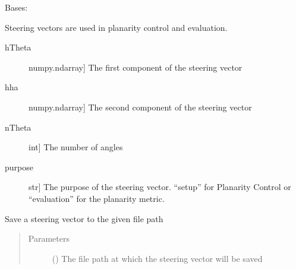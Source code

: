 \documentclass[letterpaper,10pt,english]{sphinxmanual}
\begin{document}
\begin{fulllineitems}
\label{\detokenize{source/pyzones:pyzones.SteeringVector}}
Bases: 

Steering vectors are used in planarity control and evaluation.
\begin{description}
\item[{hTheta}] \leavevmode{[}numpy.ndarray{]}
The first component of the steering vector

\item[{hha}] \leavevmode{[}numpy.ndarray{]}
The second component of the steering vector

\item[{nTheta}] \leavevmode{[}int{]}
The number of angles

\item[{purpose}] \leavevmode{[}str{]}
The purpose of the steering vector. “setup” for Planarity Control or “evaluation” for the planarity metric.

\end{description}

\begin{fulllineitems}
\label{\detokenize{source/pyzones:pyzones.SteeringVector.save}}
Save a steering vector to the given file path
\begin{quote}\begin{description}
\item[{Parameters}] \leavevmode
{} () \textendash{} The file path at which the steering vector will be saved

\end{description}\end{quote}

\end{fulllineitems}


\end{fulllineitems}

\end{document}
